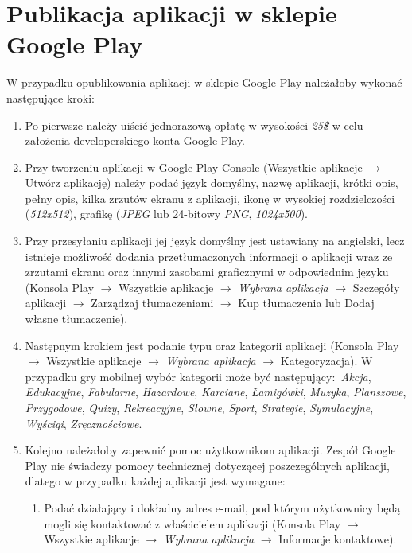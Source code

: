 \documentclass[12pt, a4paper]{article}
\begin{document}
\section{Publikacja aplikacji w sklepie Google Play}
W przypadku opublikowania aplikacji w sklepie Google Play należałoby wykonać następujące kroki:
\begin{enumerate}
\item Po pierwsze należy uiścić jednorazową opłatę w wysokości \textit{25\$} w celu założenia developerskiego konta Google Play.
\item Przy tworzeniu aplikacji w Google Play Console (Wszystkie aplikacje $\rightarrow$ Utwórz aplikację) należy podać język domyślny, nazwę aplikacji, krótki opis, pełny opis, kilka zrzutów ekranu z aplikacji, ikonę w wysokiej rozdzielczości (\textit{512x512}), grafikę (\textit{JPEG} lub 24-bitowy \textit{PNG}, \textit{1024x500}). 
\item Przy przesyłaniu aplikacji jej język domyślny jest ustawiany na angielski, lecz istnieje możliwość dodania przetłumaczonych informacji o aplikacji wraz ze zrzutami ekranu oraz innymi zasobami graficznymi w odpowiednim języku (Konsola Play $\rightarrow$ Wszystkie aplikacje $\rightarrow$ \textit{Wybrana aplikacja} $\rightarrow$ Szczegóły aplikacji $\rightarrow$ Zarządzaj tłumaczeniami $\rightarrow$ Kup tłumaczenia lub Dodaj własne tłumaczenie).
\item Następnym krokiem jest podanie typu oraz kategorii aplikacji (Konsola Play $\rightarrow$ Wszystkie aplikacje $\rightarrow$ \textit{Wybrana aplikacja} $\rightarrow$ Kategoryzacja). W przypadku gry mobilnej wybór kategorii może być następujący$\colon$ \textsl{Akcja}, \textsl{Edukacyjne}, \textsl{Fabularne}, \textsl{Hazardowe}, \textsl{Karciane}, \textsl{Łamigówki}, \textsl{Muzyka}, \textsl{Planszowe}, \textsl{Przygodowe}, \textsl{Quizy}, \textsl{Rekreacyjne}, \textsl{Słowne}, \textsl{Sport}, \textsl{Strategie}, \textsl{Symulacyjne}, \textsl{Wyścigi}, \textsl{Zręcznościowe}.
\item Kolejno należałoby zapewnić pomoc użytkownikom aplikacji. Zespół Google Play nie świadczy pomocy technicznej dotyczącej poszczególnych aplikacji, dlatego w przypadku każdej aplikacji jest wymagane$\colon$
\begin{enumerate}
\item Podać działający i dokładny adres e-mail, pod którym użytkownicy będą mogli się kontaktować z właścicielem aplikacji (Konsola Play $\rightarrow$ Wszystkie aplikacje $\rightarrow$ \textit{Wybrana aplikacja} $\rightarrow$ Informacje kontaktowe).

\end{enumerate}
\end{enumerate}
\end{document}

